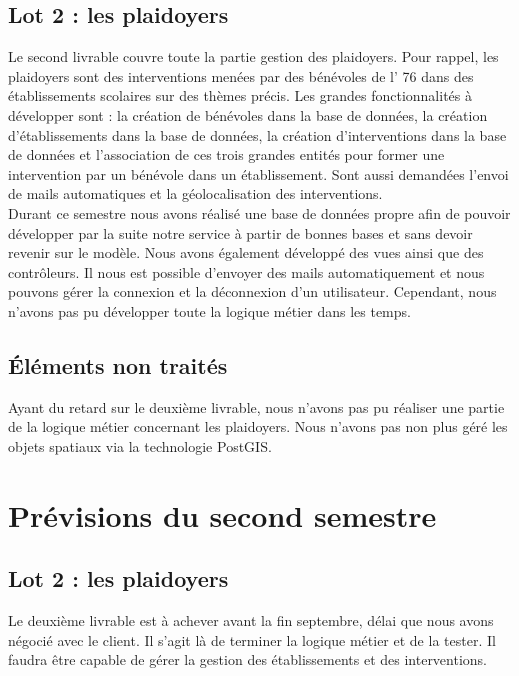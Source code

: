 \documentclass[asi]{picInsa}
\begin{document}
\subsection{Lot 2 : les plaidoyers}
Le second livrable couvre toute la partie gestion des plaidoyers. Pour rappel, les plaidoyers sont des interventions menées par des bénévoles de l'\nomClient{} 76 dans des établissements scolaires sur des thèmes précis. Les grandes fonctionnalités à développer sont : la création de bénévoles dans la base de données, la création d'établissements dans la base de données, la création d'interventions dans la base de données et l'association de ces trois grandes entités pour former une intervention par un bénévole dans un établissement. Sont aussi demandées l'envoi de mails automatiques et la géolocalisation des interventions.\vspace{0.5cm}\\
Durant ce semestre nous avons réalisé une base de données propre afin de pouvoir développer par la suite notre service à partir de bonnes bases et sans devoir revenir sur le modèle. Nous avons également développé des vues ainsi que des contrôleurs. Il nous est possible d'envoyer des mails automatiquement et nous pouvons gérer la connexion et la déconnexion d'un utilisateur.
Cependant, nous n'avons pas pu développer toute la logique métier dans les temps.

\subsection{Éléments non traités}
Ayant du retard sur le deuxième livrable, nous n'avons pas pu réaliser une partie de la logique métier concernant les plaidoyers. Nous n'avons pas non plus géré les objets spatiaux via la technologie PostGIS.


\section{Prévisions du second semestre}
\subsection{Lot 2 : les plaidoyers}
Le deuxième livrable est à achever avant la fin septembre, délai que nous avons négocié avec le client. Il s'agit là de terminer la logique métier et de la tester. Il faudra être capable de gérer la gestion des établissements et des interventions.
\end{document}
